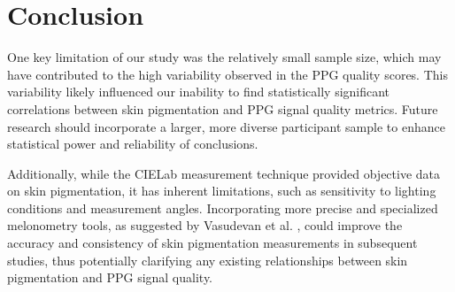 \documentclass[letterpaper, 10 pt, conference]{ieeeconf}  %
\begin{document}
\section{Conclusion}

One key limitation of our study was the relatively small sample size, which may have contributed to the high variability observed in the PPG quality scores. This variability likely influenced our inability to find statistically significant correlations between skin pigmentation and PPG signal quality metrics. Future research should incorporate a larger, more diverse participant sample to enhance statistical power and reliability of conclusions.

Additionally, while the CIELab measurement technique provided objective data on skin pigmentation, it has inherent limitations, such as sensitivity to lighting conditions and measurement angles. Incorporating more precise and specialized melonometry tools, as suggested by Vasudevan et al. \cite{vasudevan_melanometry_2024}, could improve the accuracy and consistency of skin pigmentation measurements in subsequent studies, thus potentially clarifying any existing relationships between skin pigmentation and PPG signal quality.


\end{document}
